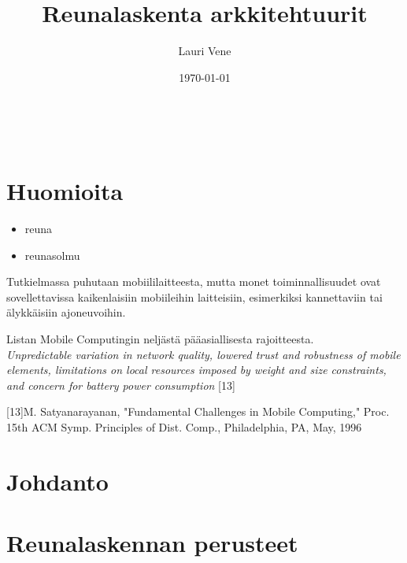 \documentclass[finnish]{tktltiki2}
\title{Reunalaskenta arkkitehtuurit}
\author{Lauri Vene}
\date{\today}
\theoremstyle{definition}
\theoremstyle{remark}
\begin{document}

\frontmatter      %

\maketitle        %
\makeabstract     %

\tableofcontents  %
\


\mainmatter       %

\section*{Huomioita}
\begin{itemize}
\item reuna
\item reunasolmu
\end{itemize}

Tutkielmassa puhutaan mobiililaitteesta, mutta monet toiminnallisuudet ovat sovellettavissa kaikenlaisiin mobiileihin laitteisiin, esimerkiksi kannettaviin tai älykkäisiin ajoneuvoihin. 

Listan Mobile Computingin neljästä pääasiallisesta rajoitteesta.\\
\textit{Unpredictable variation in network quality, lowered trust and robustness of
mobile elements, limitations on local resources imposed by
weight and size constraints, and concern for battery power
consumption} [13]

[13]M. Satyanarayanan, "Fundamental Challenges in Mobile Computing," Proc.
15th ACM Symp. Principles of Dist. Comp., Philadelphia, PA, May, 1996



\section{Johdanto}

\section{Reunalaskennan perusteet}
\end{document}
